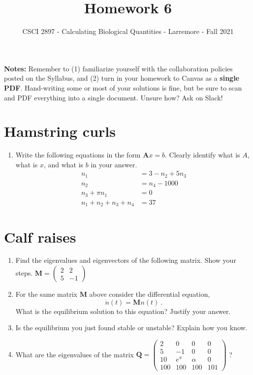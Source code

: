 \documentclass[11pt,onecolumn,superscriptaddress,notitlepage]{article}
\date{}
\begin{document}
\author{CSCI 2897 - Calculating Biological Quantities - Larremore - Fall 2021}
\title{Homework 6}
\maketitle

{\bf Notes:} Remember to (1) familiarize yourself with the collaboration policies posted on the Syllabus, and (2) turn in your homework to Canvas as a {\bf single PDF}. Hand-writing some or most of your solutions is fine, but be sure to scan and PDF everything into a single document. Unsure how? Ask on Slack! 

\section*{Hamstring curls}

\begin{enumerate}
\item Write the following equations in the form $\mathbf{A}x=b$. Clearly identify what is $A$, what is $x$, and what is $b$ in your answer.
\begin{align}
	n_1 &= 3 - n_2 + 5 n_3 \nonumber \\
	n_2 &= n_4 - 1000 \nonumber \\
	n_3 + \pi n_1 &= 0 \nonumber \\
	n_1+n_2 + n_3 + n_4 &= 37 \nonumber 
\end{align}
\end{enumerate}

\section*{Calf raises} 

\begin{enumerate}[resume]
\item Find the eigenvalues and eigenvectors of the following matrix. Show your steps.
$\mathbf{M}=
\begin{pmatrix}
2 & 2  \\ 
5 & -1
\end{pmatrix}$
\item For the same matrix $\mathbf{M}$ above consider the differential equation,
$$ \dot{n}(t) = \mathbf{M}n(t)\ .$$
What is the equilibrium solution to this equation? Justify your answer.
\item Is the equilibrium you just found stable or unstable? Explain how you know.
\item What are the eigenvalues of the matrix 
$\mathbf{Q}=
\begin{pmatrix}
2 & 0 & 0 & 0 \\ 
5 & -1 & 0 & 0 \\
10 & e^{\pi} & \alpha & 0 \\
100 & 100 & 100 & 101
\end{pmatrix}$ ?
\end{enumerate}
\end{document}
